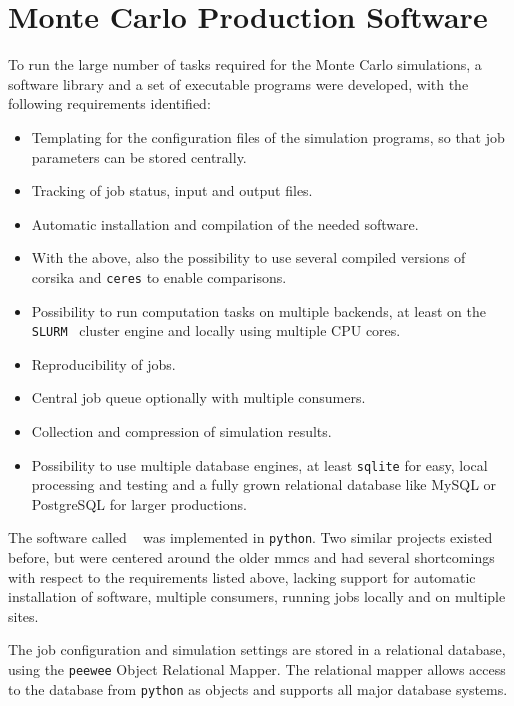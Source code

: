 \section{Monte Carlo Production Software}\label{sec:mopro}


To run the large number of tasks required for the Monte Carlo simulations,
a software library and a set of executable programs were developed,
with the following requirements identified:

\begin{itemize}[noitemsep]
  \item Templating for the configuration files of the simulation programs,
    so that job parameters can be stored centrally.
  \item Tracking of job status, input and output files.
  \item Automatic installation and compilation of the needed software.
  \item With the above, also the possibility to use several compiled versions
    of \gls{corsika} and \texttt{ceres} to enable comparisons.
  \item Possibility to run computation tasks on multiple backends,
    at least on the \texttt{SLURM}~\cite{slurm} cluster engine and locally using multiple CPU cores.
  \item Reproducibility of jobs.
  \item Central job queue optionally with multiple consumers.
  \item Collection and compression of simulation results.
  \item Possibility to use multiple database engines, at least
    \texttt{sqlite} for easy, local processing and testing and a
    fully grown relational database like MySQL or PostgreSQL for larger
    productions.
\end{itemize}

The software called \mopro~\cite{mopro3} was implemented in \texttt{python}.
Two similar projects existed before, but were centered around the
older \gls{mmcs} and had several shortcomings with respect to the requirements
listed above, lacking support for automatic installation of software,
multiple consumers, running jobs locally and on multiple sites.

The job configuration and simulation settings are stored in a relational
database, using the \texttt{peewee}\cite{peewee} Object Relational Mapper.
The relational mapper allows access to the database from \texttt{python} as objects
and supports all major database systems.

